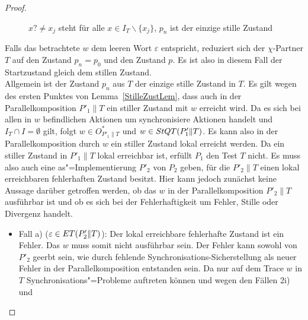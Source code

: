 \begin{proof}
\begin{figure} [h!tbp]
\begin{center}
    \caption{$x?\neq x_j$ steht für alle $x\in I_T\backslash\{x_j\}$, $p_n$
      ist der einzige stille Zustand}
    \label{TohneEmitIundO}
  \end{center}
  \end{figure}
  Falls das betrachtete $w$ dem leeren Wort $\varepsilon$ entspricht, reduziert
  sich der $\chi$-Partner $T$ auf den Zustand $p_n = p_0$ und den Zustand $p$.
  Es ist also in diesem Fall der Startzustand gleich dem stillen Zustand.\\
  Allgemein ist der Zustand $p_n$ aus $T$ der einzige stille Zustand in $T$. Es
  gilt wegen des ersten Punktes von Lemma~\ref{StilleZustLem}, dass auch in der
  Parallelkomposition $P'_1\|T$ ein stiller Zustand mit $w$ erreicht wird. Da
  es sich bei allen in $w$ befindlichen Aktionen um synchronisiere Aktionen
  handelt und $I_T\cap I=\emptyset$ gilt, folgt $w\in O_{P'_1\|T}^*$ und $w\in
  StQT (P'_1\|T)$. Es kann also in der Parallelkomposition durch $w$ ein
  stiller Zustand lokal erreicht werden. Da ein stiller Zustand in $P'_1\|T$
  lokal erreichbar ist, erfüllt $P_1$ den Test $T$ nicht. Es muss also auch
  eine as"=Implementierung $P'_2$ von $P_2$ geben, für die $P'_2\|T$ einen
  lokal erreichbaren fehlerhaften Zustand besitzt. Hier kann jedoch zunächst
  keine Aussage darüber getroffen werden, ob das $w$ in der Parallelkomposition
  $P'_2\|T$ ausführbar ist und ob es sich bei der Fehlerhaftigkeit um Fehler,
  Stille oder Divergenz handelt.
  \begin{itemize}
    \item Fall a) ($\varepsilon \in ET (P'_2\|T)$): Der lokal erreichbare
      fehlerhafte Zustand ist ein Fehler. Das $w$ muss somit nicht ausführbar
      sein. Der Fehler kann sowohl von $P'_2$ geerbt sein, wie durch fehlende
      Synchronisations-Sicherstellung als neuer Fehler in der
      Parallelkomposition entstanden sein. Da nur auf dem Trace $w$ in $T$
      Synchronisations"=Probleme auftreten können und wegen den Fällen 2i) und

\end{itemize}
\end{proof}
